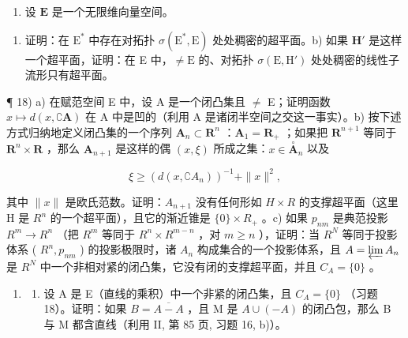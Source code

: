\begin{enumerate}
\def\labelenumi{\arabic{enumi})}
\setcounter{enumi}{16}
\tightlist
\item
  设 \(\mathbf{E}\) 是一个无限维向量空间。
\end{enumerate}

\begin{enumerate}
\def\labelenumi{\alph{enumi})}
\tightlist
\item
  证明：在 \(\mathrm{E}^*\) 中存在对拓扑 \(\sigma (\mathrm{E}^{*},\mathrm{E})\) 处处稠密的超平面。b) 如果 \(\mathbf{H}'\) 是这样一个超平面，证明：在 E 中，\(\neq \mathrm{E}\) 的、对拓扑 \(\sigma (\mathrm{E},\mathrm{H}')\) 处处稠密的线性子流形只有超平面。
\end{enumerate}

  ¶ 18) a) 在赋范空间 E 中，设 A 是一个闭凸集且 \(\neq\) E；证明函数 \(x\mapsto d(x,\complement\mathbf{A})\) 在 A 中是凹的（利用 A 是诸闭半空间之交这一事实）。b) 按下述方式归纳地定义闭凸集的一个序列 \(\mathbf{A}_{n}\subset\mathbf{R}^{n}\) ：\(\mathbf{A}_{1}=\mathbf{R}_{+}\) ；如果把 \(\mathbf{R}^{n+1}\) 等同于 \(\mathbf{R}^{n}\times\mathbf{R}\) ，那么 \(\mathbf{A}_{n+1}\) 是这样的偶 \((x,\xi)\) 所成之集：\(x\in\overset{\circ}{\mathbf{A}}_{n}\) 以及

\[
\xi \geqslant (d (x, \complement A _ {n})) ^ {- 1} + \| x \| ^ {2},
\]

其中 \(\|x\|\) 是欧氏范数。证明：\(A_{n+1}\) 没有任何形如 \(H \times R\) 的支撑超平面（这里 H 是 \(R^{n}\) 的一个超平面），且它的渐近锥是 \(\{0\} \times R_{+}\) 。c) 如果 \(p_{nm}\) 是典范投影 \(R^{m} \to R^{n}\) （把 \(R^{m}\) 等同于 \(R^{n} \times R^{m-n}\) ，对 \(m \geqslant n\) ），证明：当 \(R^{N}\) 等同于投影体系 ( \(R^{n}, p_{nm}\) ) 的投影极限时，诸 \(A_{n}\) 构成集合的一个投影体系，且 \(A = \varprojlim A_{n}\) 是 \(R^{N}\) 中一个非相对紧的闭凸集，它没有闭的支撑超平面，并且 \(C_{A} = \{0\}\) 。

\begin{enumerate}
\def\labelenumi{\arabic{enumi})}
\setcounter{enumi}{18}
\tightlist
\item
  \begin{enumerate}
  \def\labelenumii{\alph{enumii})}
  \tightlist
  \item
    设 A 是 E（直线的乘积）中一个非紧的闭凸集，且 \(C_{A} = \{0\}\) （习题 18）。证明：如果 \(B = \overline{A - A}\) ，且 M 是 \(A \cup (-A)\) 的闭凸包，那么 B 与 M 都含直线（利用 II, 第 85 页, 习题 16, b)）。
  \end{enumerate}
\end{enumerate}

